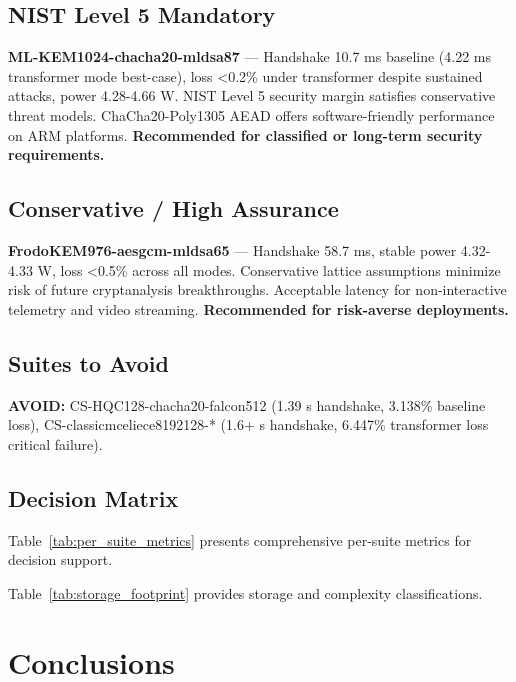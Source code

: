 \documentclass[11pt,a4paper]{article}
\begin{document}
\subsection{NIST Level 5 Mandatory}

\textbf{ML-KEM1024-chacha20-mldsa87} — Handshake 10.7 ms baseline (4.22 ms transformer mode best-case), loss <0.2\% under transformer despite sustained attacks, power 4.28-4.66 W. NIST Level 5 security margin satisfies conservative threat models. ChaCha20-Poly1305 AEAD offers software-friendly performance on ARM platforms. \textbf{Recommended for classified or long-term security requirements.}

\subsection{Conservative / High Assurance}

\textbf{FrodoKEM976-aesgcm-mldsa65} — Handshake 58.7 ms, stable power 4.32-4.33 W, loss <0.5\% across all modes. Conservative lattice assumptions minimize risk of future cryptanalysis breakthroughs. Acceptable latency for non-interactive telemetry and video streaming. \textbf{Recommended for risk-averse deployments.}

\subsection{Suites to Avoid}

\textbf{AVOID:} CS-HQC128-chacha20-falcon512 (1.39 s handshake, 3.138\% baseline loss), CS-classicmceliece8192128-* (1.6+ s handshake, 6.447\% transformer loss critical failure).

\subsection{Decision Matrix}

Table~\ref{tab:per_suite_metrics} presents comprehensive per-suite metrics for decision support.



Table~\ref{tab:storage_footprint} provides storage and complexity classifications.



\section{Conclusions}
\end{document}
